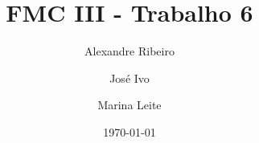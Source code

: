 \documentclass[12pt]{article}
\begin{document}
\title{FMC III - Trabalho 6}
\author{Alexandre Ribeiro \and José Ivo \and Marina Leite}
\date{\today}

\maketitle





\end{document}
